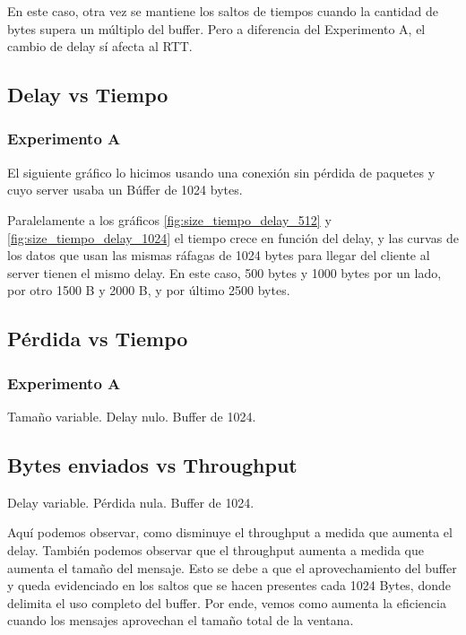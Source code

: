   
  
  En este caso, otra vez se mantiene los saltos de tiempos cuando la cantidad de bytes supera un m\'ultiplo del buffer. Pero a diferencia del Experimento A, el cambio de delay s\'i afecta al RTT. 

\subsection{Delay vs Tiempo}
\subsubsection{Experimento A}

  El siguiente gr\'afico lo hicimos usando una conexi\'on sin p\'erdida de paquetes y cuyo server usaba un B\'uffer de 1024 bytes.


  Paralelamente a los gr\'aficos \ref{fig:size_tiempo_delay_512} y \ref{fig:size_tiempo_delay_1024} el tiempo crece en funci\'on del delay, y las curvas de los datos que usan las mismas r\'afagas de 1024 bytes para llegar del cliente al server tienen el mismo delay. En este caso, 500 bytes y 1000 bytes por un lado, por otro 1500 B y 2000 B, y por \'ultimo 2500 bytes. 

\subsection{P\'erdida vs Tiempo}
\subsubsection{Experimento A}
  Tama\~no variable. Delay nulo. Buffer de 1024.
  

\subsection{Bytes enviados vs Throughput}
  Delay variable. P\'erdida nula. Buffer de 1024. 


  Aqu\'i podemos observar, como disminuye el throughput a medida que aumenta el delay. Tambi\'en podemos observar que el throughput aumenta a medida que aumenta el tama\~no del mensaje. Esto se debe a que el aprovechamiento del buffer y queda evidenciado en los saltos que se hacen presentes cada 1024 Bytes, donde delimita el uso completo del buffer.
  Por ende, vemos como aumenta la eficiencia cuando los mensajes aprovechan el tama\~no total de la ventana.
